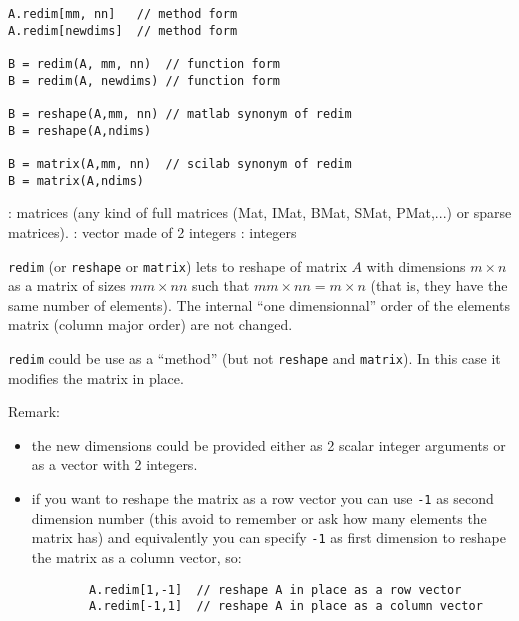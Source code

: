 
\begin{mandesc}
   \\
   \\
\end{mandesc}
\begin{calling_sequence}
\begin{verbatim}
A.redim[mm, nn]   // method form
A.redim[newdims]  // method form

B = redim(A, mm, nn)  // function form
B = redim(A, newdims) // function form

B = reshape(A,mm, nn) // matlab synonym of redim
B = reshape(A,ndims)

B = matrix(A,mm, nn)  // scilab synonym of redim
B = matrix(A,ndims)
\end{verbatim}
\end{calling_sequence}

\begin{parameters}
  \begin{varlist}
    : matrices (any kind of full matrices (Mat, IMat, BMat, SMat, PMat,...) or sparse matrices).
    :  vector made of 2 integers
    : integers
  \end{varlist}
\end{parameters}

\begin{mandescription}
\verb+redim+  (or \verb+reshape+ or \verb+matrix+) lets to reshape of matrix $A$ with dimensions
$m \times n$ as a matrix of sizes $mm \times nn$ such that 
$mm \times nn = m \times n$ (that is, they have the same number of elements).
The internal ``one dimensionnal'' order of the elements matrix (column major order) are 
not changed. 

\verb+redim+ could be use as a ``method'' (but not \verb+reshape+ and \verb+matrix+). In this case it 
modifies the matrix in place.

Remark:
\begin{itemize}
  \item the new dimensions could be provided either as 2 scalar integer arguments or as a vector with 2 integers.
  \item if you want to reshape the matrix as a row vector you can use \verb+-1+ as second dimension number (this
        avoid to remember or ask how many elements the matrix has) and equivalently you can specify \verb+-1+ as 
        first dimension to reshape the matrix as a column vector, so:
        \begin{verbatim}
        A.redim[1,-1]  // reshape A in place as a row vector
        A.redim[-1,1]  // reshape A in place as a column vector
        \end{verbatim}
\end{itemize}

\end{mandescription}

